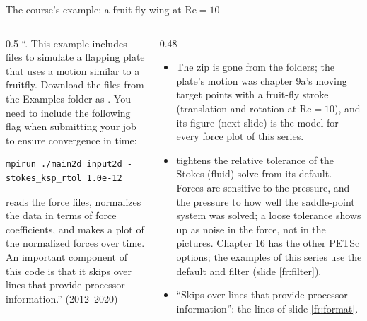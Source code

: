 \documentclass[aspectratio=169,11pt]{beamer}
\begin{document}
\begin{frame}[fragile]{The course's example: a fruit-fly wing at $\mathrm{Re} = 10$}
\label{fr:fruitfly}
\begin{columns}[T,onlytextwidth]
\begin{column}{0.5\textwidth}
\small ``. This example includes files to simulate a flapping plate that uses a motion similar to a fruitfly. Download the files from the Examples folder as . You need to include the following flag when submitting your job to ensure convergence in time:
\begin{lstlisting}[style=shell]
mpirun ./main2d input2d -stokes_ksp_rtol 1.0e-12
\end{lstlisting}
 reads the force files, normalizes the data in terms of force coefficients, and makes a plot of the normalized forces over time. An important component of this code is that it skips over lines that provide processor information.'' (2012--2020)
\end{column}
\begin{column}{0.48\textwidth}
\footnotesize
\begin{itemize}
  \item The zip is gone from the folders; the plate's motion was chapter 9a's moving target points with a fruit-fly stroke (translation and rotation at $\mathrm{Re} = 10$), and its figure (next slide) is the model for every force plot of this series.
  \item {} tightens the relative tolerance of the Stokes (fluid) solve from its default. Forces are sensitive to the pressure, and the pressure to how well the saddle-point system was solved; a loose tolerance shows up as noise in the force, not in the pictures. Chapter 16 has the other PETSc options; the examples of this series use the default and filter (slide \ref{fr:filter}).
  \item ``Skips over lines that provide processor information'': the  lines of slide \ref{fr:format}.
\end{itemize}
\end{column}
\end{columns}
\end{frame}
\end{document}
